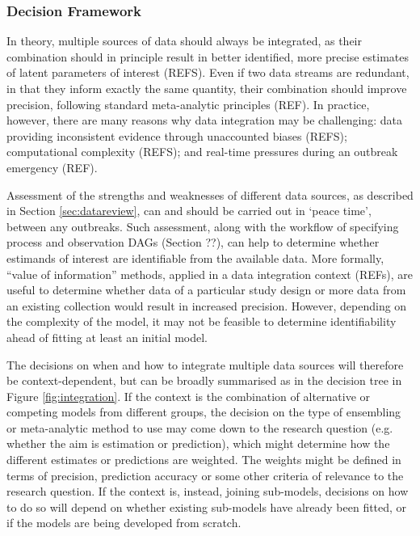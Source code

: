 \documentclass{article}
\begin{document}
\subsubsection{Decision Framework}
In theory, multiple sources of data should always be integrated, as their combination should in principle result in better identified, more precise estimates of latent parameters of interest (REFS). Even if two data streams are redundant, in that they inform exactly the same quantity, their combination should improve precision, following standard meta-analytic principles (REF). In practice, however, there are many reasons why data integration may be challenging: data providing inconsistent evidence through unaccounted biases (REFS); computational complexity (REFS); and real-time pressures during an outbreak emergency (REF).

Assessment of the strengths and weaknesses of different data sources, as described in Section \ref{sec:datareview}, can and should be carried out in `peace time', between any outbreaks. Such assessment, along with the workflow of specifying process and observation DAGs (Section ??), can help to determine whether estimands of interest are identifiable from the available data. More formally, ``value of information'' methods, applied in a data integration context (REFs), are useful to determine whether data of a particular study design or more data from an existing collection would result in increased precision. However, depending on the complexity of the model, it may not be feasible to determine identifiability ahead of fitting at least an initial model.

The decisions on when and how to integrate multiple data sources will therefore be context-dependent, but can be broadly summarised as in the decision tree in Figure \ref{fig:integration}. If the context is the combination of alternative or competing models from different groups, the decision on the type of ensembling or meta-analytic method to use may come down to the research question (e.g. whether the aim is estimation or prediction), which might determine how the different estimates or predictions are weighted. The weights might be defined in terms of precision, prediction accuracy or some other criteria of relevance to the research question. If the context is, instead, joining sub-models, decisions on how to do so will depend on whether existing sub-models have already been fitted, or if the models are being developed from scratch.
\end{document}
